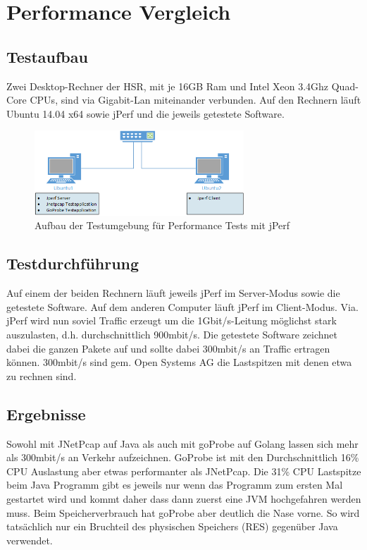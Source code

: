 \section{Performance Vergleich}
\label{sec:Performance Vergleich}

\subsection{Testaufbau}
Zwei Desktop-Rechner der HSR, mit je 16GB Ram und Intel Xeon 3.4Ghz Quad-Core CPUs, sind via Gigabit-Lan miteinander verbunden. Auf den Rechnern läuft Ubuntu 14.04 x64 sowie jPerf und die jeweils getestete Software.

\begin{figure}[ht]
    \begin{center}
		\includegraphics[width=0.7\textwidth]{start/img/PerformanceEvaluation.png}
    \end{center}
    \caption{Aufbau der Testumgebung für Performance Tests mit jPerf}
\end{figure}

\subsection{Testdurchführung}
Auf einem der beiden Rechnern läuft jeweils jPerf im Server-Modus sowie die getestete Software. Auf dem anderen Computer läuft jPerf im Client-Modus.
Via. jPerf wird nun soviel Traffic erzeugt um die 1Gbit/s-Leitung möglichst stark auszulasten, d.h. durchschnittlich 900mbit/s. Die getestete Software zeichnet dabei die ganzen Pakete auf und sollte dabei 300mbit/s an Traffic ertragen können. 300mbit/s sind gem. Open Systems AG die Lastspitzen mit denen etwa zu rechnen sind.

\subsection{Ergebnisse}
Sowohl mit JNetPcap auf Java als auch mit goProbe auf Golang lassen sich mehr als 300mbit/s an Verkehr aufzeichnen. GoProbe ist mit den Durchschnittlich 16\% CPU Auslastung aber etwas performanter als JNetPcap. Die 31\% CPU Lastspitze beim Java Programm gibt es jeweils nur wenn das Programm zum ersten Mal gestartet wird und kommt daher dass dann zuerst eine \acs{JVM} hochgefahren werden muss.
Beim Speicherverbrauch hat goProbe aber deutlich die Nase vorne. So wird tatsächlich nur ein Bruchteil des physischen Speichers (RES) gegenüber Java verwendet.

